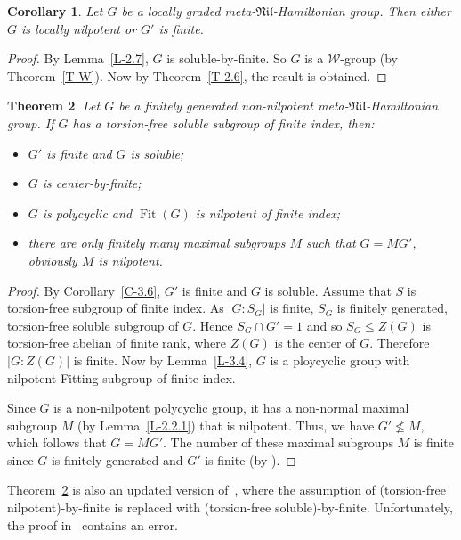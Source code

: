 \documentclass[11pt]{amsart}
\newtheorem{theorem}{Theorem}[section]
\newtheorem{corollary}[theorem]{Corollary}
\DeclareMathOperator{\Fit}{Fit}
\newcommand{\sub}{\leqslant}
\newcommand{\nsub}{\nleqslant}
\begin{document}
\begin{corollary}\label{C-3.7}
Let  $G$ be a locally graded  meta-$\mathfrak{Nil}$-Hamiltonian group. Then either $G$ is locally nilpotent or $G'$ is finite.
\end{corollary}
\begin{proof}
By Lemma~\ref{L-2.7}, $G$ is soluble-by-finite. So $G$ is a $\mathcal{W}$-group (by Theorem~\ref{T-W}). Now by Theorem~\ref{T-2.6}, the result is obtained.
\end{proof}

\begin{theorem}\label{T-3.8}
Let $G$ be a finitely generated non-nilpotent meta-$\mathfrak{Nil}$-Hamiltonian group. If $G$ has a torsion-free soluble subgroup of finite index, then:
\begin{itemize}
\item[(i)] $G'$ is finite and $G$ is soluble;
\item[(ii)] $G$ is center-by-finite;
\item[(iii)]$G$ is polycyclic and $\Fit(G)$ is nilpotent of finite index;
\item[(iv)] there are only finitely many maximal subgroups $M$ such that $G=MG'$, obviously $M$ is nilpotent.
\end{itemize}
\end{theorem}
\begin{proof}
 By Corollary~\ref{C-3.6},  $G'$ is finite and $G$ is soluble. Assume that $S$ is torsion-free subgroup of finite index. As  $|G: S_G|$ is finite, $S_G$ is finitely generated, torsion-free soluble subgroup of $G$. Hence $S_G\cap G'=1$ and so $S_G\sub Z(G)$ is torsion-free abelian of finite rank, where $Z(G)$ is the center of $G$. Therefore $|G: Z(G)|$ is finite.
Now by Lemma~\ref{L-3.4}, $G$ is a ploycyclic group with nilpotent Fitting subgroup of finite index. 

Since $G$ is a non-nilpotent polycyclic group, it has a non-normal maximal subgroup $M$ (by Lemma~\ref{L-2.2.1}) that is nilpotent. Thus, we have $G' \nsub M$, which follows that $G = MG'$. The number of these maximal subgroups $M$ is finite since $G$ is finitely generated and $G'$ is finite (by \cite[2.7]{DKS}).
\end{proof}

Theorem~\ref{T-3.8} is also an updated version of~\cite[Theorem 3.5]{DM}, where the assumption of (torsion-free nilpotent)-by-finite is replaced with (torsion-free soluble)-by-finite. Unfortunately, the proof in~\cite[Proposition 5.5]{DM} contains an error.
\end{document}
